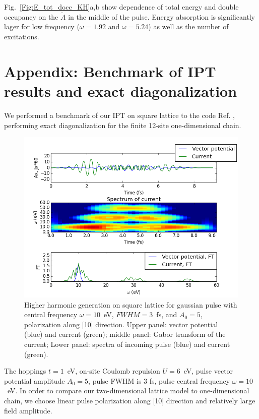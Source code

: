 Fig.~\ref{Fig:E_tot_docc_KH}a,b show dependence of total energy and double occupancy on the $\tilde{A}$ in the middle of the pulse. Energy absorption is significantly lager for low frequency ($\omega=1.92$ and $\omega=5.24$) as well as the number of excitations.


\FloatBarrier
\section{\label{Benchmark}Appendix: Benchmark of IPT results and exact diagonalization}

We performed a benchmark of our IPT on square lattice to the code 
Ref. \cite{Rui}, performing exact diagonalization for the finite 12-site one-dimensional chain.
\begin{figure}[h!]
 \includegraphics[width=0.9\linewidth,angle=0]{Chapters/KH_solid/HHGtestVitja.png}
\caption{Higher harmonic generation on square lattice for gaussian pulse with central frequency $\omega=10$~eV, $FWHM=3$~fs, and $A_{0}=5$, polarization along [10] direction. Upper panel: vector potential (blue) and current (green); middle panel: Gabor transform of the current; Lower panel: spectra of incoming pulse (blue) and current (green).}
\label{HHGtestVitja}  
\end{figure}
The hoppings $t=1$~eV, on-site Coulomb repulsion $U=6$~eV, pulse vector potential amplitude $A_{0}=5$, pulse FWHM is 3 fs, pulse central frequency $\omega=10$~eV. In order to compare our two-dimensional lattice model to one-dimensional chain, we choose linear pulse polarization along [10] direction and relatively large field amplitude.

